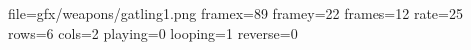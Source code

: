 file=gfx/weapons/gatling1.png
framex=89
framey=22
frames=12
rate=25
rows=6
cols=2
playing=0
looping=1
reverse=0
